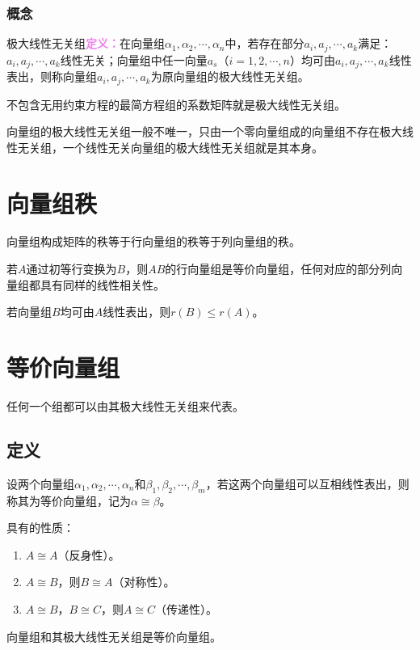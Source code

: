 \documentclass[UTF8, 12pt]{ctexart}
\begin{document}
\subsubsection{概念}

极大线性无关组\textcolor{violet}{\textbf{定义：}}在向量组$\alpha_1,\alpha_2,\cdots,\alpha_n$中，若存在部分$a_i,a_j,\cdots,a_k$满足：$a_i,a_j,\cdots,a_k$线性无关；向量组中任一向量$a_s$（$i=1,2,\cdots,n$）均可由$a_i,a_j,\cdots,a_k$线性表出，则称向量组$a_i,a_j,\cdots,a_k$为原向量组的极大线性无关组。

不包含无用约束方程的最简方程组的系数矩阵就是极大线性无关组。

向量组的极大线性无关组一般不唯一，只由一个零向量组成的向量组不存在极大线性无关组，一个线性无关向量组的极大线性无关组就是其本身。

\section{向量组秩}

向量组构成矩阵的秩等于行向量组的秩等于列向量组的秩。

若$A$通过初等行变换为$B$，则$AB$的行向量组是等价向量组，任何对应的部分列向量组都具有同样的线性相关性。

若向量组$B$均可由$A$线性表出，则$r(B)\leqslant r(A)$。

\section{等价向量组}

任何一个组都可以由其极大线性无关组来代表。

\subsection{定义}

设两个向量组$\alpha_1,\alpha_2,\cdots,\alpha_n$和$\beta_1,\beta_2,\cdots,\beta_m$，若这两个向量组可以互相线性表出，则称其为等价向量组，记为$\alpha\cong\beta$。

具有的性质：

\begin{enumerate}
\item $A\cong A$（反身性）。
\item $A\cong B$，则$B\cong A$（对称性）。
\item $A\cong B$，$B\cong C$，则$A\cong C$（传递性）。
\end{enumerate}

向量组和其极大线性无关组是等价向量组。
\end{document}
